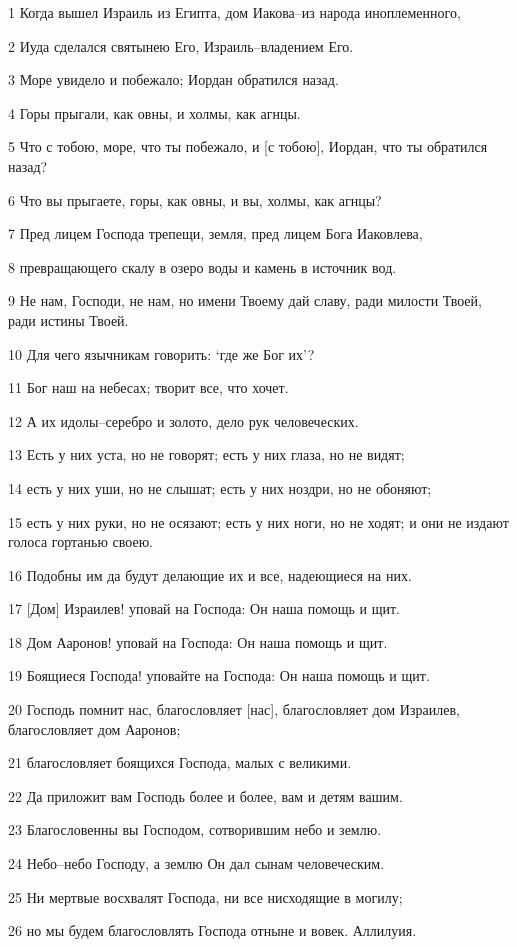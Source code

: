 \par 1 Когда вышел Израиль из Египта, дом Иакова--из народа иноплеменного,
\par 2 Иуда сделался святынею Его, Израиль--владением Его.
\par 3 Море увидело и побежало; Иордан обратился назад.
\par 4 Горы прыгали, как овны, и холмы, как агнцы.
\par 5 Что с тобою, море, что ты побежало, и [с тобою], Иордан, что ты обратился назад?
\par 6 Что вы прыгаете, горы, как овны, и вы, холмы, как агнцы?
\par 7 Пред лицем Господа трепещи, земля, пред лицем Бога Иаковлева,
\par 8 превращающего скалу в озеро воды и камень в источник вод.
\par 9 Не нам, Господи, не нам, но имени Твоему дай славу, ради милости Твоей, ради истины Твоей.
\par 10 Для чего язычникам говорить: `где же Бог их'?
\par 11 Бог наш на небесах; творит все, что хочет.
\par 12 А их идолы--серебро и золото, дело рук человеческих.
\par 13 Есть у них уста, но не говорят; есть у них глаза, но не видят;
\par 14 есть у них уши, но не слышат; есть у них ноздри, но не обоняют;
\par 15 есть у них руки, но не осязают; есть у них ноги, но не ходят; и они не издают голоса гортанью своею.
\par 16 Подобны им да будут делающие их и все, надеющиеся на них.
\par 17 [Дом] Израилев! уповай на Господа: Он наша помощь и щит.
\par 18 Дом Ааронов! уповай на Господа: Он наша помощь и щит.
\par 19 Боящиеся Господа! уповайте на Господа: Он наша помощь и щит.
\par 20 Господь помнит нас, благословляет [нас], благословляет дом Израилев, благословляет дом Ааронов;
\par 21 благословляет боящихся Господа, малых с великими.
\par 22 Да приложит вам Господь более и более, вам и детям вашим.
\par 23 Благословенны вы Господом, сотворившим небо и землю.
\par 24 Небо--небо Господу, а землю Он дал сынам человеческим.
\par 25 Ни мертвые восхвалят Господа, ни все нисходящие в могилу;
\par 26 но мы будем благословлять Господа отныне и вовек. Аллилуия.

